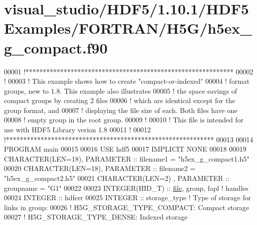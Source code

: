 \hypertarget{visual__studio_2_h_d_f5_21_810_81_2_h_d_f5_examples_2_f_o_r_t_r_a_n_2_h5_g_2h5ex__g__compact_8f90_source}{}\section{visual\+\_\+studio/\+H\+D\+F5/1.10.1/\+H\+D\+F5\+Examples/\+F\+O\+R\+T\+R\+A\+N/\+H5\+G/h5ex\+\_\+g\+\_\+compact.f90}
\label{visual__studio_2_h_d_f5_21_810_81_2_h_d_f5_examples_2_f_o_r_t_r_a_n_2_h5_g_2h5ex__g__compact_8f90_source}

\begin{DoxyCode}
00001 \textcolor{comment}{!************************************************************}
00002 \textcolor{comment}{!}
00003 \textcolor{comment}{!  This example shows how to create "compact-or-indexed"}
00004 \textcolor{comment}{!  format groups, new to 1.8.  This example also illustrates}
00005 \textcolor{comment}{!  the space savings of compact groups by creating 2 files}
00006 \textcolor{comment}{!  which are identical except for the group format, and}
00007 \textcolor{comment}{!  displaying the file size of each.  Both files have one}
00008 \textcolor{comment}{!  empty group in the root group.}
00009 \textcolor{comment}{!}
00010 \textcolor{comment}{!  This file is intended for use with HDF5 Library verion 1.8}
00011 \textcolor{comment}{!}
00012 \textcolor{comment}{!************************************************************}
00013 
00014 \textcolor{keyword}{PROGRAM} main
00015 
00016   \textcolor{keywordtype}{USE }hdf5
00017   \textcolor{keywordtype}{IMPLICIT NONE}
00018 
00019   \textcolor{keywordtype}{CHARACTER(LEN=18)}, \textcolor{keywordtype}{PARAMETER} :: filename1 = \textcolor{stringliteral}{"h5ex\_g\_compact1.h5"}
00020   \textcolor{keywordtype}{CHARACTER(LEN=18)}, \textcolor{keywordtype}{PARAMETER} :: filename2 = \textcolor{stringliteral}{"h5ex\_g\_compact2.h5"}
00021   \textcolor{keywordtype}{CHARACTER(LEN=2)} , \textcolor{keywordtype}{PARAMETER} :: groupname  = \textcolor{stringliteral}{"G1"}
00022 
00023   \textcolor{keywordtype}{INTEGER(HID\_T)}   :: \hyperlink{structfile}{file}, group, fapl \textcolor{comment}{! handles}
00024   \textcolor{keywordtype}{INTEGER} :: hdferr
00025   \textcolor{keywordtype}{INTEGER} :: storage\_type \textcolor{comment}{! Type of storage for links in group:}
00026                           \textcolor{comment}{!   H5G\_STORAGE\_TYPE\_COMPACT: Compact storage}
00027                           \textcolor{comment}{!   H5G\_STORAGE\_TYPE\_DENSE: Indexed storage}

\end{DoxyCode}
